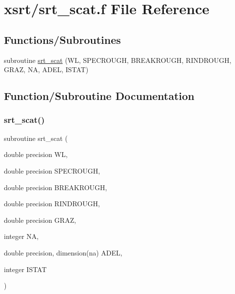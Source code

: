 \hypertarget{srt__scat_8f}{}\section{xsrt/srt\+\_\+scat.f File Reference}
\label{srt__scat_8f}
\subsection*{Functions/\+Subroutines}
\begin{DoxyCompactItemize}
\item 
subroutine \hyperlink{srt__scat_8f_ab6bf908b6179a60dfcd74faa97e3f355}{srt\+\_\+scat} (WL, S\+P\+E\+C\+R\+O\+U\+GH, B\+R\+E\+A\+K\+R\+O\+U\+GH, R\+I\+N\+D\+R\+O\+U\+GH, G\+R\+AZ, NA, A\+D\+EL, I\+S\+T\+AT)
\end{DoxyCompactItemize}


\subsection{Function/\+Subroutine Documentation}
\mbox{\label{srt__scat_8f_ab6bf908b6179a60dfcd74faa97e3f355}} 
\subsubsection{\texorpdfstring{srt\+\_\+scat()}{srt\_scat()}}
{\footnotesize\ttfamily subroutine srt\+\_\+scat (\begin{DoxyParamCaption}\item[{double precision}]{WL,  }\item[{double precision}]{S\+P\+E\+C\+R\+O\+U\+GH,  }\item[{double precision}]{B\+R\+E\+A\+K\+R\+O\+U\+GH,  }\item[{double precision}]{R\+I\+N\+D\+R\+O\+U\+GH,  }\item[{double precision}]{G\+R\+AZ,  }\item[{integer}]{NA,  }\item[{double precision, dimension(na)}]{A\+D\+EL,  }\item[{integer}]{I\+S\+T\+AT }\end{DoxyParamCaption})}

